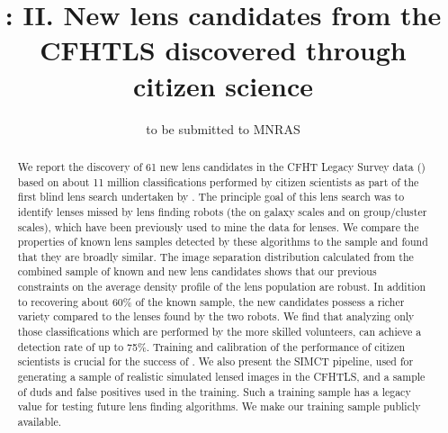 \documentclass[useAMS,usenatbib,a4paper]{mn2e}
\title[\sw II]
{\SW: II. New lens candidates from the CFHTLS discovered
through citizen science}
\author[More et al.]{%
 
}
\begin{document}
\date{to be submitted to MNRAS}
\pagerange{\pageref{firstpage}--\pageref{lastpage}}

\maketitle

\label{firstpage}


\begin{abstract}

We report the discovery of 61 new lens candidates in the CFHT Legacy Survey data
(\cfhtls) based on about 11 million classifications performed by citizen
scientists as part of the first blind lens search undertaken by \sw.  The
principle goal of this lens search was to identify lenses missed by lens finding
robots (the \rf on galaxy scales and \af on group/cluster scales), which have
been previously used to mine the \cfhtls data for lenses.  We compare the
properties of known lens samples detected by these algorithms to the \sw sample
and found that they are broadly similar.  The image separation distribution
calculated from the combined sample of known and new lens candidates shows that
our previous constraints on the average density profile of the lens population
are robust.  In addition to recovering about 60\% of the known sample, the new
\sw candidates possess a richer variety compared to the lenses found by the two
robots. We find that analyzing only those classifications which are performed by
the more skilled volunteers, \sw can achieve a detection rate of up to 75\%.
Training and calibration of the performance of citizen scientists is crucial for
the success of \sw. We also present the SIMCT pipeline, used for generating a
sample of realistic simulated lensed images in the CFHTLS, and a sample of duds
and false positives used in the training.  Such a training sample has a legacy
value for testing future lens finding algorithms. We make our training sample
publicly available.



\end{abstract}
\end{document}
